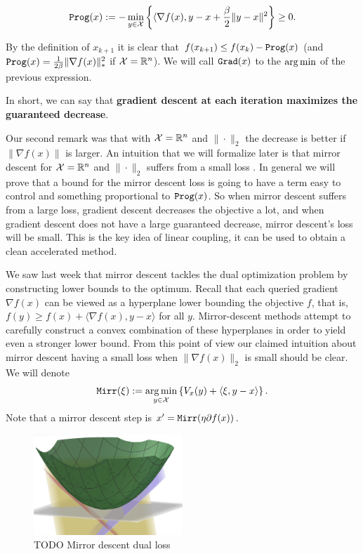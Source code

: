 \[
    {\tt{Prog}}(x) := - \min_{y\in\mathcal{X}} \left\{ \langle \nabla f(x), y-x + \frac{\beta}{2} \|{y-x}\|^2\right\} \geq 0.
\]

By the definition of $x_{k+1}$ it is clear that $f(x_{k+1}) \leq f(x_k) - {\tt{Prog}}(x)$ (and ${\tt{Prog}}(x) = \frac{1}{2\beta} \|\nabla f(x)\|_\ast^2$ if $\mathcal{X} = \mathbb{R}^n$). We will call ${\tt{Grad}}(x)$ to the $\operatorname*{arg\,min}$ of the previous expression.

In short, we can say that \textbf{gradient descent at each iteration maximizes the guaranteed decrease}. 

Our second remark was that with $\mathcal{X} = \mathbb{R}^n$ and $\|\cdot \|_2$ the decrease is better if $\|\nabla f(x)\|$ is larger. An intuition that we will formalize later is that mirror descent for $\mathcal{X} = \mathbb{R}^n$ and $\|\cdot \|_2$ suffers from a small loss . In general we will prove that a bound for the mirror descent loss is going to have a term easy to control and something proportional to ${\tt{Prog}}(x)$. So when mirror descent suffers from a large loss, gradient descent decreases the objective a lot, and when gradient descent does not have a large guaranteed decrease, mirror descent's loss will be small. This is the key idea of linear coupling, it can be used to obtain a clean accelerated method.

We saw last week that mirror descent tackles the dual optimization problem by constructing lower bounds to the optimum. Recall that each queried gradient $\nabla f(x)$ can be viewed as a hyperplane lower bounding the objective $f$, that is, $f (y) \geq f (x)+ \langle \nabla f (x), y-x \rangle$ for all $y$. Mirror-descent methods attempt to carefully construct a convex combination of these hyperplanes in order to yield even a stronger lower bound. From this point of view our claimed intuition about mirror descent having a small loss when $\|\nabla f(x)\|_2$ is small should be clear. We will denote
\[
    {\tt{Mirr}}(\xi) := \operatorname*{arg\,min}_{y \in \mathcal{X}} \left\{ V_x(y) + \langle \xi, y-x \rangle \right\}.
\]
Note that a mirror descent step is $x' = {\tt{Mirr}}(\eta \partial f(x))$. 



\begin{figure}[h!] \label{mirror_descent_dual_loss}
\centering
        \includegraphics[width=0.5\textwidth]{img/mirror_descent_dual_loss} 
        \caption{TODO Mirror descent dual loss}
\end{figure}

